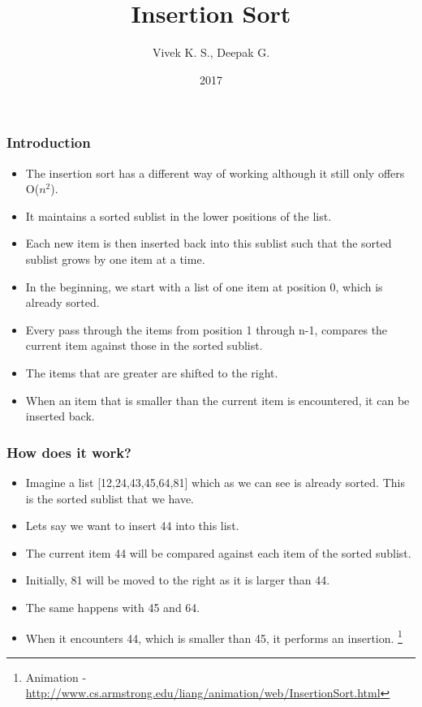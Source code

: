 \documentclass{beamer}
\title{Insertion Sort}
\author{Vivek K. S., Deepak G.}
\institute{Information Systems Decision Sciences (ISDS)\\
MUMA College of Business\\
University of South Florida \\
Tampa, Florida}
\date{2017}
\begin{document}
\frame{\titlepage}
\begin{frame}
\frametitle{Introduction}
\begin{itemize}
\item The insertion sort has  a different way of working although it still only offers O($n^2$).
\item It maintains a sorted sublist in the lower positions of the list.
\item Each new item is then inserted back into this sublist such that the sorted sublist grows by one item at a time.
\item In the beginning, we start with a list of one item at position 0, which is already sorted.
\item Every pass through the items from position 1 through n-1, compares the current item against those in the sorted sublist.
\item The items that are greater are shifted to the right.
\item When an item that is smaller than the current item is encountered, it can be inserted back.
\end{itemize}
\end{frame}


\begin{frame}
\frametitle{How does it work?}
\begin{itemize}
\item Imagine a list [12,24,43,45,64,81] which as we can see is already sorted. This  is the sorted sublist that we have.
\item Lets say we want to insert 44 into this list.
\item The current item 44 will be compared against each item of the sorted sublist.
\item Initially, 81 will be moved to the right as it is larger than 44. 
\item The same happens with 45 and 64.
\item When it encounters 44, which is smaller than 45, it performs an insertion.
\footnote{Animation - \url{http://www.cs.armstrong.edu/liang/animation/web/InsertionSort.html}}
\end{itemize}
\end{frame}
\end{document}
